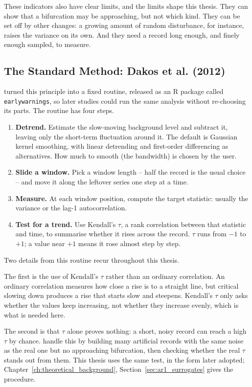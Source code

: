 These indicators also have clear limits, and the limits shape this thesis. They can show that a bifurcation may be approaching, but not which kind. They can be set off by other changes: a growing amount of random disturbance, for instance, raises the variance on its own. And they need a record long enough, and finely enough sampled, to measure.

\subsection{The Standard Method: Dakos et al. (2012)}
\label{sec:classical_method}
\citet{dakos2012} turned this principle into a fixed routine, released as an R package called \texttt{earlywarnings}, so later studies could run the same analysis without re-choosing its parts. The routine has four steps.

\begin{enumerate}
  \item \textbf{Detrend.} Estimate the slow-moving background level and subtract it, leaving only the short-term fluctuation around it. The default is Gaussian kernel smoothing, with linear detrending and first-order differencing as alternatives. How much to smooth (the bandwidth) is chosen by the user.
  \item \textbf{Slide a window.} Pick a window length -- half the record is the usual choice -- and move it along the leftover series one step at a time.
  \item \textbf{Measure.} At each window position, compute the target statistic: usually the variance or the lag-1 autocorrelation.
  \item \textbf{Test for a trend.} Use Kendall's $\tau$, a rank correlation between that statistic and time, to summarise whether it rises across the record. $\tau$ runs from $-1$ to $+1$; a value near $+1$ means it rose almost step by step.
\end{enumerate}

Two details from this routine recur throughout this thesis.

The first is the use of Kendall's $\tau$ rather than an ordinary correlation. An ordinary correlation measures how close a rise is to a straight line, but critical slowing down produces a rise that starts slow and steepens. Kendall's $\tau$ only asks whether the values keep increasing, not whether they increase evenly, which is what is needed here.

The second is that $\tau$ alone proves nothing: a short, noisy record can reach a high $\tau$ by chance. \citet{dakos2012} handle this by building many artificial records with the same noise as the real one but no approaching bifurcation, then checking whether the real $\tau$ stands out from them. This thesis uses the same test, in the form \citet{bury2021} later adopted; Chapter~\ref{ch:theoretical_background}, Section~\ref{sec:ar1_surrogates} gives the procedure.


